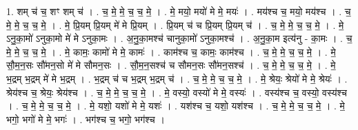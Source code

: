 \documentclass[17pt]{extarticle}
\begin{document}
1. शम् च॑ च॒ शꣳ शम् च॑ । . च॒ मे॒ मे॒ च॒ च॒ मे॒ । . मे॒ मयो॒ मयो॑ मे मे॒ मयः॑ । . मय॑श्च च॒ मयो॒ मय॑श्च । . च॒ मे॒ मे॒ च॒ च॒ मे॒ । . मे॒ प्रि॒यम् प्रि॒यम् मे॑ मे प्रि॒यम् । . प्रि॒यम् च॑ च प्रि॒यम् प्रि॒यम् च॑ । . च॒ मे॒ मे॒ च॒ च॒ मे॒ । . मे॒ ऽनु॒का॒मो॑ ऽनुका॒मो मे॑ मे ऽनुका॒मः । . अ॒नु॒का॒मश्च॑ चानुका॒मो॑ ऽनुका॒मश्च॑ । . अ॒नु॒का॒म इत्य॑नु - का॒मः । . च॒ मे॒ मे॒ च॒ च॒ मे॒ । . मे॒ कामः॒ कामो॑ मे मे॒ कामः॑ । . काम॑श्च च॒ कामः॒ काम॑श्च । . च॒ मे॒ मे॒ च॒ च॒ मे॒ । . मे॒ सौ॒म॒न॒सः सौ॑मन॒सो मे॑ मे सौमन॒सः । . सौ॒म॒न॒सश्च॑ च सौमन॒सः सौ॑मन॒सश्च॑ । . च॒ मे॒ मे॒ च॒ च॒ मे॒ । . मे॒ भ॒द्रम् भ॒द्रम् मे॑ मे भ॒द्रम् । . भ॒द्रम् च॑ च भ॒द्रम् भ॒द्रम् च॑ । . च॒ मे॒ मे॒ च॒ च॒ मे॒ । . मे॒ श्रेयः॒ श्रेयो॑ मे मे॒ श्रेयः॑ । . श्रेय॑श्च च॒ श्रेयः॒ श्रेय॑श्च । . च॒ मे॒ मे॒ च॒ च॒ मे॒ । . मे॒ वस्यो॒ वस्यो॑ मे मे॒ वस्यः॑ । . वस्य॑श्च च॒ वस्यो॒ वस्य॑श्च । . च॒ मे॒ मे॒ च॒ च॒ मे॒ । . मे॒ यशो॒ यशो॑ मे मे॒ यशः॑ । . यश॑श्च च॒ यशो॒ यश॑श्च । . च॒ मे॒ मे॒ च॒ च॒ मे॒ । . मे॒ भगो॒ भगो॑ मे मे॒ भगः॑ । . भग॑श्च च॒ भगो॒ भग॑श्च । \newline
\end{document}
